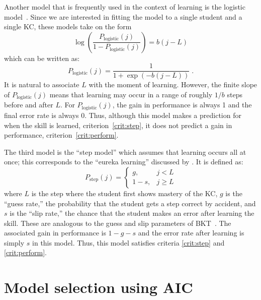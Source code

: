 \documentclass{edm_template}
\begin{document}
Another model that is frequently used in the context of learning is
the logistic model~\cite{cen_learning_2006,chi_instructional_2011}.
Since we are interested in fitting the model to a single student 
and a single KC, these models take on the form 
%
\begin{equation}
    \log\left(\frac{P_\mathrm{logistic}(j)}{1-P_\mathrm{logistic}(j)}\right)= 
                 b (j-L) 
\end{equation}
which can be written as:
\begin{equation}
    P_\mathrm{logistic}(j)= \frac{1}{1+\exp\left(-b (j-L)\right)} \; .
\end{equation}
%
It is natural to associate $L$ with the moment of learning.  However,
the finite slope of $P_\mathrm{logistic}(j)$ means that learning may
occur in a range of roughly $1/b$ steps before and after $L$.  For
$P_\mathrm{logistic}(j)$, the gain in performance is always 1 and the
final error rate is always 0.  Thus, although this model makes a
prediction for when the skill is learned, criterion~\ref{crit:step},
it does not predict a gain in performance,
criterion~\ref{crit:perform}.

The third model is the ``step model'' which assumes that learning 
occurs all at once; this corresponds to the ``eureka learning''
discussed by \cite{baker_detecting_2011}.   It is defined as:
%
\begin{equation}
    P_\mathrm{step}(j)= \left\{\begin{array}{cc}
                 g, & j<L \\
                 1-s, & j\ge L 
                 \end{array} \right. 
\end{equation}
%
where $L$ is the step where the student first shows mastery of the KC,
$g$ is the ``guess rate,'' the probability that the student gets a
step correct by accident, and $s$ is the ``slip rate,'' the chance
that the student makes an error after learning the skill.  These are
analogous to the guess and slip parameters of
BKT~\cite{corbett_knowledge_1995}.  The associated gain in performance
is $1-g-s$ and the error rate after learning is simply $s$ in this
model.  Thus, this model satisfies criteria \ref{crit:step} and
\ref{crit:perform}.

\section{Model selection using AIC}
\label{model-selection}
\end{document}
